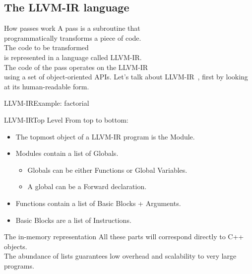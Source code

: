 
\subsection{The LLVM-IR language}


\begin{frame}{How passes work}
\centering
A \alert{pass} is a \alert{subroutine} that \\programmatically
transforms a piece of code.\\
\bigskip
The code to be transformed \\is represented in a language 
called \alert{LLVM-IR}.\\
\bigskip
The code of the pass operates on the LLVM-IR \\using a set of
\alert{object-oriented APIs}.
\vfill
Let's talk about LLVM-IR~\cite{LOCAL:www/llvmLanguageRef}, 
first by looking at its \alert{human-readable} form.
\end{frame}


\begin{frame}{LLVM-IR}{Example: factorial}
\begin{center}
\begin{varwidth}{20cm}
\llvminput[\ttfamily\fontsize{7pt}{5pt}\selectfont]{snippet/fact.ll}
\end{varwidth}
\end{center}
\end{frame}


\begin{frame}{LLVM-IR}{Top Level}
From top to bottom:
\begin{itemize}
\item The topmost object of a LLVM-IR program is the \alert{Module}.
\item \alert{Modules} contain a list of \alert{Globals}.
	\begin{itemize}
	\item {Globals} can be either \alert{Functions} or \alert{Global Variables}.
	\item A global can be a \alert{Forward declaration}.
	\end{itemize}
\item \alert{Functions} contain a list of \alert{Basic Blocks} + \alert{Arguments}.
\item \alert{Basic Blocks} are a list of \alert{Instructions}.
\end{itemize}
\begin{block}{The in-memory representation}
All these parts will correspond directly to \alert{C++ objects}.\\
The abundance of lists guarantees low overhead and scalability to very large programs.
\end{block}
\end{frame}


